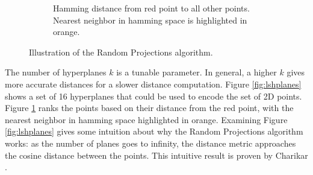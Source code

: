 \begin{figure}[h]
\begin{subfigure}[t]{0.24\textwidth}
            \caption{Hamming distance from red point to all other points. Nearest neighbor in hamming space is highlighted in orange.}
            \label{fig:lshdist}
    \end{subfigure}
    \caption{Illustration of the Random Projections algorithm.}
    \label{fig:lsh}
\end{figure}

The number of hyperplanes $k$ is a tunable parameter. In general, a higher $k$ gives more accurate distances for a slower distance computation. Figure \ref{fig:lshplanes} shows a set of 16 hyperplanes that could be used to encode the set of 2D points. Figure \ref{fig:lshdist} ranks the points based on their distance from the red point, with the nearest neighbor in hamming space highlighted in orange. Examining Figure \ref{fig:lshplanes} gives some intuition about why the Random Projections algorithm works: as the number of planes goes to infinity, the distance metric approaches the cosine distance between the points. This intuitive result is proven by Charikar \cite{charikar2002similarity}.

